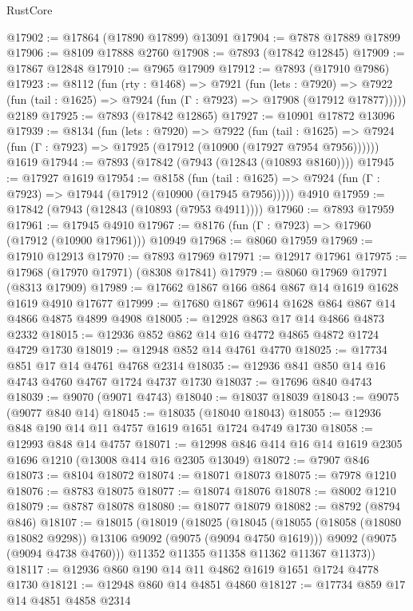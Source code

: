 \begin{lexlean}{RustCore}
\begin{coremodule}
@17902 := @17864 (@17890 @17899) @13091
@17904 := @7878 @17889 @17899
@17906 := @8109 @17888 @2760
@17908 := @7893 (@17842 @12845)
@17909 := @17867 @12848
@17910 := @7965 @17909
@17912 := @7893 (@17910 @7986)
@17923 := @8112
    (fun (rty : @1468) =>
    @7921
      (fun (lets : @7920) =>
      @7922 (fun (tail : @1625) => @7924 (fun (Γ : @7923) => @17908 (@17912 @17877)))))
    @2189
@17925 := @7893 (@17842 @12865)
@17927 := @10901 @17872 @13096
@17939 := @8134
    (fun (lets : @7920) =>
    @7922
      (fun (tail : @1625) =>
      @7924 (fun (Γ : @7923) => @17925 (@17912 (@10900 (@17927 @7954 @7956))))))
    @1619
@17944 := @7893 (@17842 (@7943 (@12843 (@10893 @8160))))
@17945 := @17927 @1619
@17954 := @8158
    (fun (tail : @1625) => @7924 (fun (Γ : @7923) => @17944 (@17912 (@10900 (@17945 @7956)))))
    @4910
@17959 := @17842 (@7943 (@12843 (@10893 (@7953 @4911))))
@17960 := @7893 @17959
@17961 := @17945 @4910
@17967 := @8176 (fun (Γ : @7923) => @17960 (@17912 (@10900 @17961))) @10949
@17968 := @8060 @17959
@17969 := @17910 @12913
@17970 := @7893 @17969
@17971 := @12917 @17961
@17975 := @17968 (@17970 @17971) (@8308 @17841)
@17979 := @8060 @17969 @17971 (@8313 @17909)
@17989 := @17662 @1867 @166 @864 @867 @14 @1619 @1628 @1619 @4910 @17677
@17999 := @17680 @1867 @9614 @1628 @864 @867 @14 @4866 @4875 @4899 @4908
@18005 := @12928 @863 @17 @14 @4866 @4873 @2332
@18015 := @12936 @852 @862 @14 @16 @4772 @4865 @4872 @1724 @4729 @1730
@18019 := @12948 @852 @14 @4761 @4770
@18025 := @17734 @851 @17 @14 @4761 @4768 @2314
@18035 := @12936 @841 @850 @14 @16 @4743 @4760 @4767 @1724 @4737 @1730
@18037 := @17696 @840 @4743
@18039 := @9070 (@9071 @4743)
@18040 := @18037 @18039
@18043 := @9075 (@9077 @840 @14)
@18045 := @18035 (@18040 @18043)
@18055 := @12936 @848 @190 @14 @11 @4757 @1619 @1651 @1724 @4749 @1730
@18058 := @12993 @848 @14 @4757
@18071 := @12998 @846 @414 @16 @14 @1619 @2305 @1696 @1210 (@13008 @414 @16 @2305 @13049)
@18072 := @7907 @846
@18073 := @8104 @18072
@18074 := @18071 @18073
@18075 := @7978 @1210
@18076 := @8783 @18075
@18077 := @18074 @18076
@18078 := @8002 @1210
@18079 := @8787 @18078
@18080 := @18077 @18079
@18082 := @8792 (@8794 @846)
@18107 := @18015
    (@18019
      (@18025
        (@18045
          (@18055 (@18058 (@18080 @18082 @9298)) @13106 @9092 (@9075 (@9094 @4750 @1619)))
          @9092
          (@9075 (@9094 @4738 @4760)))
        @11352
        @11355
        @11358
        @11362
        @11367
        @11373))
@18117 := @12936 @860 @190 @14 @11 @4862 @1619 @1651 @1724 @4778 @1730
@18121 := @12948 @860 @14 @4851 @4860
@18127 := @17734 @859 @17 @14 @4851 @4858 @2314

\end{coremodule}
\end{lexlean}
